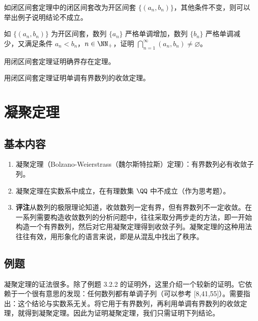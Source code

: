 \begin{xexercise}[2]
如闭区间套定理中的闭区间套改为开区间套 $\{(a_n,b_n)\}$，其他条件不变，则可以举出例子说明结论不成立。
\end{xexercise}

\begin{xexercise}[3]
如 $\{(a_n,b_n)\}$ 为开区间套，数列 $\{a_n\}$ 严格单调增加，数列 $\{b_n\}$ 严格单调减少，又满足条件 $a_n<b_n$，$n\in\NN_+$，证明 $\bigcap_{n=1}^{\infty}(a_n,b_n)\neq\varnothing$。
\end{xexercise}

\begin{xexercise}[4]
用闭区间套定理证明确界存在定理。
\end{xexercise}

\begin{xexercise}[5]
用闭区间套定理证明单调有界数列的收敛定理。
\end{xexercise}

\section{凝聚定理}

\subsection{基本内容}

\begin{enumerate}
  \item 凝聚定理（Bolzano-Weierstrass（魏尔斯特拉斯）定理）：有界数列必有收敛子列。
  \item 凝聚定理在实数系中成立，在有理数集 $\QQ$ 中不成立（作为思考题）。
  \item \textbf{评注}\quad 从数列的极限理论知道，收敛数列一定有界，但有界数列不一定收敛。在一系列需要构造收敛数列的分析问题中，往往采取分两步走的方法，即一开始构造一个有界数列，然后对它用凝聚定理得到收敛子列。凝聚定理的这种用法往往有效，用形象化的语言来说，即是从混乱中找出了秩序。
\end{enumerate}

\subsection{例题}

凝聚定理的证法很多。除了例题 3.2.2 的证明外，这里介绍一个较新的证明。它依赖于一个很有意思的发现：任何数列都有单调子列（可以参考 [8,41,55]）。需要指出：这个结论与实数系无关。将它用于有界数列，再利用单调有界数列的收敛定理，就得到凝聚定理。因此为证明凝聚定理，我们只需证明下列结论。

